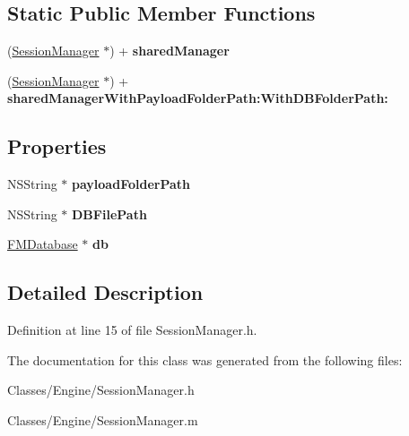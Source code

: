 \subsection*{Static Public Member Functions}
\begin{DoxyCompactItemize}
\item 
\hypertarget{interface_session_manager_a8a2ebd6a6f8ac42a7296d503dc8a3ee6}{
(\hyperlink{interface_session_manager}{SessionManager} $\ast$) + {\bfseries sharedManager}}
\label{interface_session_manager_a8a2ebd6a6f8ac42a7296d503dc8a3ee6}

\item 
\hypertarget{interface_session_manager_ac3facfcdce099c2235a37efd3098bdad}{
(\hyperlink{interface_session_manager}{SessionManager} $\ast$) + {\bfseries sharedManagerWithPayloadFolderPath:WithDBFolderPath:}}
\label{interface_session_manager_ac3facfcdce099c2235a37efd3098bdad}

\end{DoxyCompactItemize}
\subsection*{Properties}
\begin{DoxyCompactItemize}
\item 
\hypertarget{interface_session_manager_ad2e75ca8fae2991a72573d18bd848d9c}{
NSString $\ast$ {\bfseries payloadFolderPath}}
\label{interface_session_manager_ad2e75ca8fae2991a72573d18bd848d9c}

\item 
\hypertarget{interface_session_manager_a5df5d6bcc70f450a045648d6b1283b55}{
NSString $\ast$ {\bfseries DBFilePath}}
\label{interface_session_manager_a5df5d6bcc70f450a045648d6b1283b55}

\item 
\hypertarget{interface_session_manager_ac19a46384cec8549426a87783d1b1c13}{
\hyperlink{interface_f_m_database}{FMDatabase} $\ast$ {\bfseries db}}
\label{interface_session_manager_ac19a46384cec8549426a87783d1b1c13}

\end{DoxyCompactItemize}


\subsection{Detailed Description}


Definition at line 15 of file SessionManager.h.



The documentation for this class was generated from the following files:\begin{DoxyCompactItemize}
\item 
Classes/Engine/SessionManager.h\item 
Classes/Engine/SessionManager.m\end{DoxyCompactItemize}
